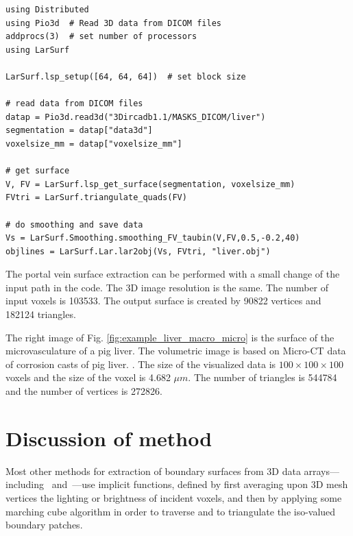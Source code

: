 \begin{lstlisting}[caption={Get surface from DICOM volumetric data}, label={lst:example1}, basicstyle=\small]
using Distributed
using Pio3d  # Read 3D data from DICOM files
addprocs(3)  # set number of processors
using LarSurf

LarSurf.lsp_setup([64, 64, 64])  # set block size

# read data from DICOM files
datap = Pio3d.read3d("3Dircadb1.1/MASKS_DICOM/liver")
segmentation = datap["data3d"]
voxelsize_mm = datap["voxelsize_mm"]

# get surface
V, FV = LarSurf.lsp_get_surface(segmentation, voxelsize_mm)
FVtri = LarSurf.triangulate_quads(FV)

# do smoothing and save data
Vs = LarSurf.Smoothing.smoothing_FV_taubin(V,FV,0.5,-0.2,40)
objlines = LarSurf.Lar.lar2obj(Vs, FVtri, "liver.obj")
\end{lstlisting}

The portal vein surface extraction can be performed with a small change of the input path in the code.
The 3D image resolution is the same. 
The number of input voxels is 103533. 
The output surface is created by 90822 vertices and 182124 triangles. 

The right image of Fig. \ref{fig:example_liver_macro_micro} is the surface of the microvasculature of a pig liver. 
The volumetric image is based on Micro-CT data of corrosion casts of pig liver.
\cite{eberlova2017use}.
The size of the visualized data is $100\times100\times100$ voxels and the size of the voxel is 4.682 $\mu{}m$.
The number of triangles is 
544784 and the number of vertices is 272826.





\section{Discussion of method}\label{sec:discussion}

Most other methods for extraction of boundary surfaces from 3D data arrays---including~\cite{10.1016/j.cad.2006.09.003} and~\cite{10.1115/1.2960489}---use implicit functions, defined by first averaging upon 3D mesh vertices the lighting or brightness of incident voxels, and then by applying some marching cube algorithm in order to traverse and to triangulate  the iso-valued boundary patches.  

